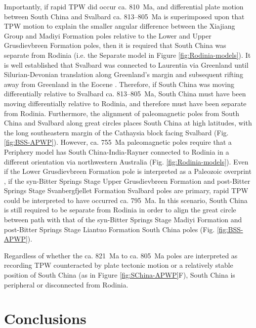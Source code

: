 Importantly, if rapid TPW did occur ca. 810~Ma, and differential plate motion between South China and Svalbard ca. 813--805~Ma is superimposed upon that TPW motion to explain the smaller angular difference between the Xiajiang Group and Madiyi Formation poles relative to the Lower and Upper Grusdievbreen Formation poles, then it is required that South China was separate from Rodinia (i.e. the Separate model in Figure \ref{fig:Rodinia-models}). It is well established that Svalbard was connected to Laurentia via Greenland until Silurian-Devonian translation along Greenland's margin and subsequent rifting away from Greenland in the Eocene \citep{Torsvik2016a}. Therefore, if South China was moving differentially relative to Svalbard ca. 813--805~Ma, South China must have been moving differentially relative to Rodinia, and therefore must have been separate from Rodinia. Furthermore, the alignment of paleomagnetic poles from South China and Svalbard along great circles places South China at high latitudes, with the long southeastern margin of the Cathaysia block facing Svalbard (Fig. \ref{fig:BSS-APWP}). However, ca. 755~Ma paleomagnetic poles require that a Periphery model has South China-India-Rayner connected to Rodinia in a different orientation via northwestern Australia (Fig. \ref{fig:Rodinia-models}). Even if the Lower Grusdievbreen Formation pole is interpreted as a Paleozoic overprint \citep{Michalski2011a}, if the syn-Bitter Springs Stage Upper Grusdievbreen Formation and post-Bitter Springs Stage Svanbergfjellet Formation Svalbard poles are primary, rapid TPW could be interpreted to have occurred ca. 795~Ma. In this scenario, South China is still required to be separate from Rodinia in order to align the great circle between path with that of the syn-Bitter Springs Stage Madiyi Formation and post-Bitter Springs Stage Liantuo Formation South China poles (Fig. \ref{fig:BSS-APWP}).

Regardless of whether the ca. 821~Ma to ca. 805~Ma poles are interpreted as recording TPW counteracted by plate tectonic motion or a relatively stable position of South China (as in Figure \ref{fig:SChina-APWP}F), South China is peripheral or disconnected from Rodinia.

\section{Conclusions}


